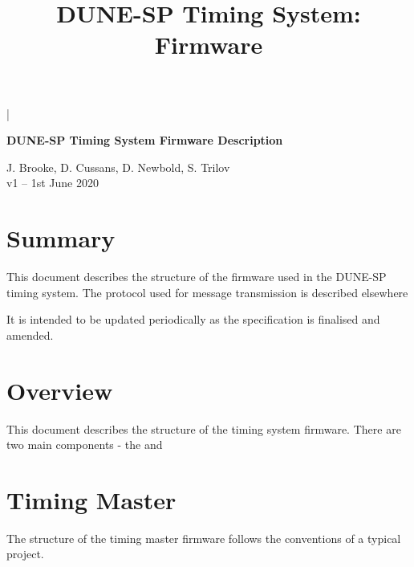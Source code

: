 \documentclass{dune}
\begin{document}

\lstMakeShortInline[columns=fixed]|




\title{DUNE-SP Timing System: Firmware}
\begin{center}
{\LARGE\bf DUNE-SP Timing System Firmware Description}
\vspace{1cm}

J. Brooke, D. Cussans, D. Newbold, S. Trilov \\
\vspace*{1ex}
v1 -- 1st June 2020
\end{center}
\vspace*{\fill}
\setcounter{tocdepth}{1}
\tableofcontents
\vspace*{\fill}

\section{Summary}

This document describes the structure of the firmware used in the DUNE-SP timing system. The protocol used for message transmission is described elsewhere\cite{ref:dts-sp-timing-protocol}

It is intended to be updated periodically as the specification is finalised and amended.

\newpage
\section{Overview}

This document describes the structure of the timing system firmware. There are two main components - the  and 

\section{Timing Master}

The structure of the timing master firmware follows the conventions of a typical  project.
\end{document}
